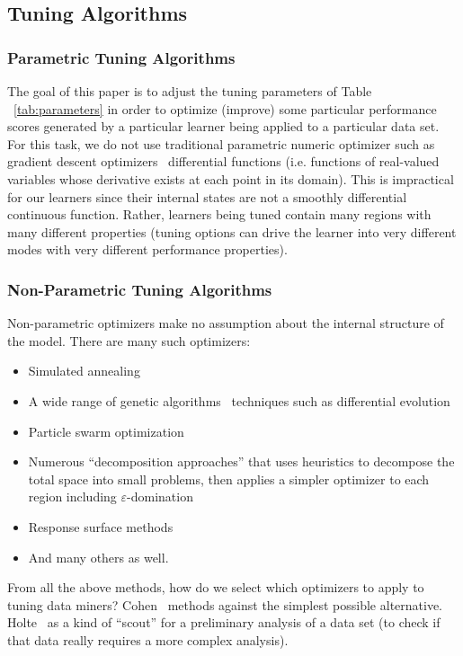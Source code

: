 \documentclass{sig-alternative}
\newcommand{\bi}{\begin{itemize}[leftmargin=0.4cm]}
\newcommand{\ei}{\end{itemize}}
\newcommand{\tab}[1]{Table ~\ref{tab:#1}}
\begin{document}
\subsection{Tuning Algorithms}


 \subsubsection{Parametric Tuning Algorithms}
The  goal of this paper is to adjust the tuning parameters of \tab{parameters}
in order to   optimize (improve) some particular performance scores
generated by a particular learner being applied to  a particular data set.
For this task, we do not use traditional parametric numeric optimizer  
such as  gradient descent optimizers~
differential functions (i.e. functions of real-valued variables whose derivative exists at each point in its domain).
This is impractical  for  our learners since their internal states are   not a smoothly differential continuous function.
Rather, learners being tuned  contain many regions with many different properties (tuning options can
drive the learner into very different modes with very different performance properties).


 \subsubsection{Non-Parametric Tuning Algorithms}
 
Non-parametric  optimizers   make no assumption
about the internal structure of the model.
There are many such optimizers:
\bi
\item
Simulated annealing~
\item
A wide range of genetic algorithms~
techniques such as differential evolution~
\item
Particle swarm optimization~
\item 
Numerous ``decomposition approaches'' that uses
    heuristics to decompose the total space into   small problems,   then applies a
    simpler optimizer to each region including \mbox{$\varepsilon$-domination}~
    \item 
    Response surface methods~
    \item
    And many others as well.
    \ei
From all the above methods, how do we select which optimizers to apply to tuning data miners?
Cohen~
 methods against the simplest possible alternative. 
Holte~
 as a
kind of ``scout'' for a  preliminary analysis of a data
set (to check if that data really requires a more
complex analysis).
\end{document}

